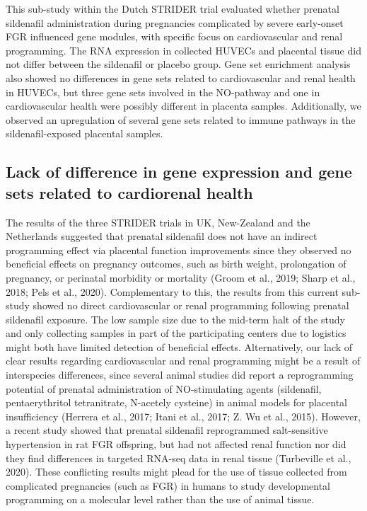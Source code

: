 \documentclass[authordate, empirical]{jote-new-article}
\begin{document}
This sub-study within the Dutch STRIDER trial evaluated whether prenatal sildenafil administration during pregnancies complicated by severe early-onset FGR influenced gene modules, with specific focus on cardiovascular and renal programming. The RNA expression in collected HUVECs and placental tissue did not differ between the sildenafil or placebo group. Gene set enrichment analysis also showed no differences in gene sets related to cardiovascular and renal health in HUVECs, but three gene sets involved in the NO-pathway and one in cardiovascular health were possibly different in placenta samples. Additionally, we observed an upregulation of several gene sets related to immune pathways in the sildenafil-exposed placental samples.







\subsection{Lack of difference in gene expression and gene sets related to cardiorenal health}



The results of the three STRIDER trials in UK, New-Zealand and the Netherlands suggested that prenatal sildenafil does not have an indirect programming effect via placental function improvements since they observed no beneficial effects on pregnancy outcomes, such as birth weight, prolongation of pregnancy, or perinatal morbidity or mortality (Groom et al., 2019; Sharp et al., 2018; Pels et al., 2020). Complementary to this, the results from this current sub-study showed no direct cardiovascular or renal programming following prenatal sildenafil exposure. The low sample size due to the mid-term halt of the study and only collecting samples in part of the participating centers due to logistics might both have limited detection of beneficial effects. Alternatively, our lack of clear results regarding cardiovascular and renal programming might be a result of interspecies differences, since several animal studies did report a reprogramming potential of prenatal administration of NO-stimulating agents (sildenafil, pentaerythritol tetranitrate, N-acetely cysteine) in animal models for placental insufficiency (Herrera et al., 2017; Itani et al., 2017; Z. Wu et al., 2015). However, a recent study showed that prenatal sildenafil reprogrammed salt-sensitive hypertension in rat FGR offspring, but had not affected renal function nor did they find differences in targeted RNA-seq data in renal tissue (Turbeville et al., 2020). These conflicting results might plead for the use of tissue collected from complicated pregnancies (such as FGR) in humans to study developmental programming on a molecular level rather than the use of animal tissue.
\end{document}
